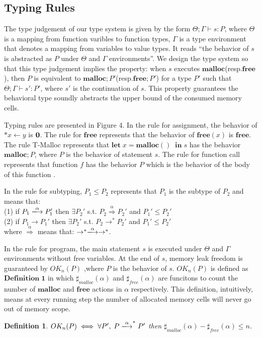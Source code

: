 \documentclass[english]{jssst_ppl} %
\newcommand\LET{\mathbf{let}\;}
\newcommand\IN{\mathbf{in}\;}
\newcommand\MALLOC{\mathbf{malloc()}\;}
\newcommand\Malloc{\mathbf{malloc}}
\newcommand\Free{\mathbf{free}}
\newcommand\Cirx{(x)}
\newtheorem{myDef}{Definition}
\begin{document}
\subsection{Typing Rules}
The type judgement of our type system is given by the form $\Theta ; \Gamma \vdash s : P$, where $\Theta$ is a mapping from function varibles to function types, $\Gamma$ is a type environment that denotes a mapping from variables to value types.
It reads ``the behavior of $s$ is abstracted as $P$ under $\Theta$ and $\Gamma$ environments''. We design the type system so that this type judgement implies the property: when $s$ executes $\Malloc$(resp.$\Free$), then $P$ is equivalent to $\Malloc;P'$(resp.$\Free;P'$) for a type $P'$ such that $\Theta; \Gamma \vdash s': P'$, where $s'$ is the continuation of $s$. This property guarantees the behavioral type soundly abstracts the upper bound of the consumed memory cells.

Typing rules are presented in Figure 4. In the rule for assignment, the behavior of  $*x \leftarrow y$ is $\bf 0$. The rule for $\Free$ represents that the behavior of $\Free \Cirx$ is $\Free$. The rule T-Malloc represents that $\LET x = \MALLOC \; \IN s$ has the behavior $\Malloc;P$, where $P$ is the behavior of statement $s$. The rule for function call represents that function $f$ has the behavior $P$ which is the behavior of the body of this function .

In the rule for subtyping, $P_{1} \le P_{2}$ represents that $P_{1}$ is the subtype of $P_{2}$ and  means that: \\
(1) if $P_{1} \xlongrightarrow{\alpha}  P_{1}'$ then $\exists P_{2}' $ s.t. $P_{2} \overset{\text{$\alpha$}}{\Longrightarrow} P_{2}'$ and $ P_{1}' \le P_{2}' $\\
(2) if $P_{1} \rightarrow P_{1}'$ then $\exists P_{2}'$ s.t. $P_{2} \rightarrow^{*} P_{2}'$ and  $P_{1}' \le P_{2}'$\\
where $\overset{\text{$\alpha$}}{\Longrightarrow}$ means that: $\rightarrow^{*} \xlongrightarrow{\alpha} \rightarrow^{*}$.

In the rule for program, the main statement $s$ is executed under $\Theta$ and $\Gamma$ environments without free variables. At the end of $s$, memory leak freedom is guaranteed by $OK_{n}(P)$ ,where $P$ is the behavior of $s$. $OK_{n}(P)$ is defined as $\mathbf{Definition\; 1}$ in which $\sharp_{malloc}(\alpha)$ and $\sharp_{free}(\alpha)$ are funcitons to count the number of $\Malloc$ and $\Free$ actions in $\alpha$ respectively. This definition, intuitively, means at every running step the number of allocated memory cells will never go out of memory scope.
\begin{myDef}
 $OK_{n}(P) \iff \forall P',\; P \xlongrightarrow{\alpha}^{*}P'$ then $\sharp_{malloc}(\alpha)-\sharp_{free}(\alpha)\le n$.
\end{myDef}
\end{document}
